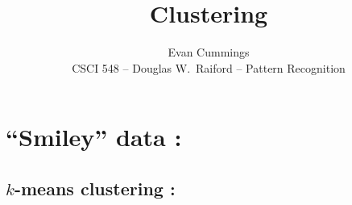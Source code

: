 


\footnotesize

\title{Clustering}
\author{Evan Cummings\\
CSCI 548 -- Douglas W.~Raiford -- Pattern Recognition}

\maketitle

\section{``Smiley'' data :}

\subsection{$k$-means clustering :}

